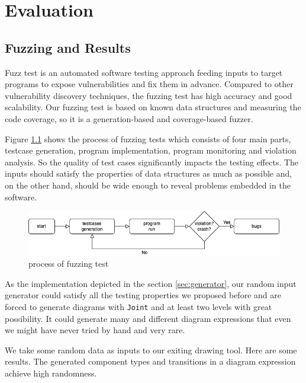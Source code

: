 \chapter{Evaluation}
\label{chap:evaluation}
\section{Fuzzing and Results}
Fuzz test is an automated software testing approach feeding inputs to target programs to expose vulnerabilities and fix them in advance. Compared to other vulnerability discovery techniques, the fuzzing test has high accuracy and good scalability.  
Our fuzzing test is based on known data structures and measuring the code coverage, so it is a generation-based and coverage-based fuzzer.\cite{li_zhao_zhang_2018}

Figure \ref{fig:fuzzing} shows the process of fuzzing tests which consists of four main parts, testcase generation, program implementation, program monitoring and violation analysis. So the quality of test cases significantly impacts the testing effects. The inputs should satisfy the properties of data structures as much as possible and, on the other hand, should be wide enough to reveal problems embedded in the software. \cite{li_zhao_zhang_2018}
\begin{figure}[ht]
    \centering
    \includegraphics[scale=0.4]{Bilder/fuzz.png}
    \caption{process of fuzzing test}
    \label{fig:fuzzing}
\end{figure}

As the implementation depicted in the section \ref {sec:generator}, our random input generator could satisfy all the testing properties we proposed before and are forced to generate diagrams with \verb|Joint| and at least two levels with great possibility. 
It could generate many and different diagram expressions that even we might have never tried by hand and very rare. 

We take some random data as inputs to our exiting drawing tool. 
Here are some results. The generated component types and transitions in a diagram expression achieve high randomness.

